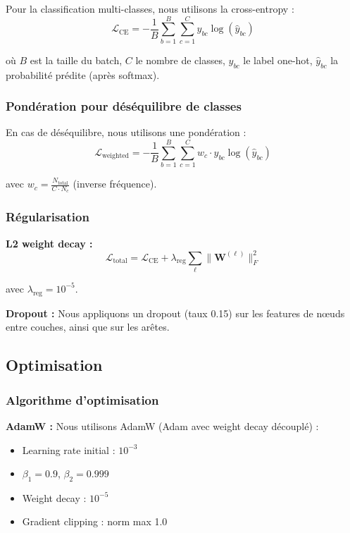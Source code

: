 Pour la classification multi-classes, nous utilisons la cross-entropy :
\[
\mathcal{L}_{\text{CE}} = -\frac{1}{B}\sum_{b=1}^B \sum_{c=1}^C y_{bc} \log(\hat{y}_{bc})
\]

où $B$ est la taille du batch, $C$ le nombre de classes, $y_{bc}$ le label one-hot, $\hat{y}_{bc}$ la probabilité prédite (après softmax).

\subsubsection{Pondération pour déséquilibre de classes}

En cas de déséquilibre, nous utilisons une pondération :
\[
\mathcal{L}_{\text{weighted}} = -\frac{1}{B}\sum_{b=1}^B \sum_{c=1}^C w_c \cdot y_{bc} \log(\hat{y}_{bc})
\]

avec $w_c = \frac{N_{\text{total}}}{C \cdot N_c}$ (inverse fréquence).

\subsubsection{Régularisation}

\textbf{L2 weight decay :}
\[
\mathcal{L}_{\text{total}} = \mathcal{L}_{\text{CE}} + \lambda_{\text{reg}} \sum_{\ell} \|\mathbf{W}^{(\ell)}\|_F^2
\]

avec $\lambda_{\text{reg}} = 10^{-5}$.

\textbf{Dropout :}
Nous appliquons un dropout (taux 0.15) sur les features de nœuds entre couches, ainsi que sur les arêtes.

\subsection{Optimisation}

\subsubsection{Algorithme d'optimisation}

\textbf{AdamW :}
Nous utilisons AdamW (Adam avec weight decay découplé) :
\begin{itemize}
    \item Learning rate initial : $10^{-3}$
    \item $\beta_1 = 0.9$, $\beta_2 = 0.999$
    \item Weight decay : $10^{-5}$
    \item Gradient clipping : norm max 1.0
\end{itemize}

